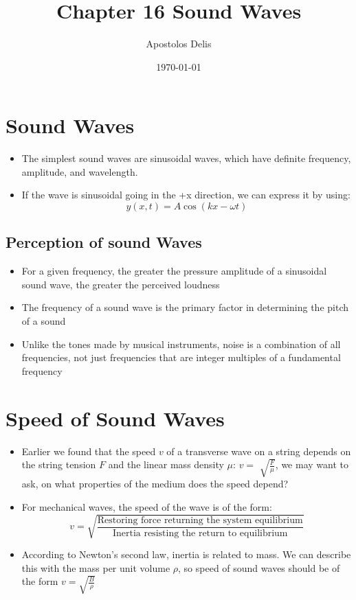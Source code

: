 \documentclass[11pt, a4paper]{article}
\begin{document}
\title{Chapter 16 Sound Waves}
\author{Apostolos Delis}
\date{\today}
\maketitle

\tableofcontents
\section[16.1, Sound Waves]{Sound Waves}
\begin{itemize}
    \item The simplest sound waves are sinusoidal waves, which have definite frequency,
        amplitude, and wavelength.
    \item  If the wave is sinusoidal going in the +x direction, we can express it by
        using:
        \begin{equation}
            y(x,t) = A\cos(kx -\omega t)
        \end{equation}
\end{itemize}
\subsection{Perception of sound Waves}
\begin{itemize}
    \item For a given frequency, the greater the pressure amplitude of a sinusoidal
        sound wave, the greater the perceived loudness
    \item The frequency of a sound wave is the primary factor in determining the pitch of
        a sound
    \item Unlike the tones made by musical instruments, noise is a combination of all
        frequencies, not just frequencies that are integer multiples of a fundamental
        frequency
\end{itemize}
\section[16.2, Speed of Sound Waves]{Speed of Sound Waves}
\begin{itemize}
    \item Earlier we found that the speed $v$ of a transverse wave on a string depends on
        the string tension $F$ and the linear mass density $\mu$: $v =$
        $\sqrt{\frac{F}{\mu}}$, we may want to ask, on what properties of the medium does
        the speed depend?
    \item For mechanical waves, the speed of the wave is of the form:
        \begin{equation}
            v = \sqrt{\frac{\text{Restoring force returning the system equilibrium}}
            {\text{Inertia resisting the return to equilibrium}}}
        \end{equation}
    \item According to Newton’s second law, inertia is related to mass. We can describe
        this with the mass per unit volume $\rho$, so speed of sound waves should be of
        the form $v = \sqrt{\frac{B}{\rho}}$
\end{itemize}
\end{document}
